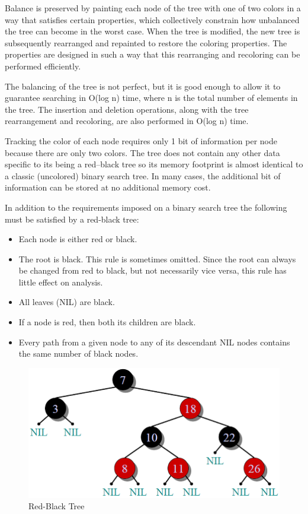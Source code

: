 \documentclass{article}
\begin{document}
Balance is preserved by painting each node of the tree with one of two colors in a way that satisfies certain properties, which collectively constrain how unbalanced the tree can become in the worst case. When the tree is modified, the new tree is subsequently rearranged and repainted to restore the coloring properties. The properties are designed in such a way that this rearranging and recoloring can be performed efficiently.

The balancing of the tree is not perfect, but it is good enough to allow it to guarantee searching in O(log n) time, where n is the total number of elements in the tree. The insertion and deletion operations, along with the tree rearrangement and recoloring, are also performed in O(log n) time.

Tracking the color of each node requires only 1 bit of information per node because there are only two colors. The tree does not contain any other data specific to its being a red–black tree so its memory footprint is almost identical to a classic (uncolored) binary search tree. In many cases, the additional bit of information can be stored at no additional memory cost.

In addition to the requirements imposed on a binary search tree the following must be satisfied by a red-black tree:

\begin{itemize}
\item Each node is either red or black.
\item The root is black. This rule is sometimes omitted. Since the root can always be changed from red to black, but not necessarily vice versa, this rule has little effect on analysis.
\item All leaves (NIL) are black.
\item If a node is red, then both its children are black.
\item Every path from a given node to any of its descendant NIL nodes contains the same number of black nodes.
\end{itemize}

\begin{figure}[H]
  \centering
  \includegraphics[width=\linewidth]{./pics/rbt.png}
  \caption{Red-Black Tree}
  \label{fig:Red-Black Tree}
\end{figure}
\end{document}
